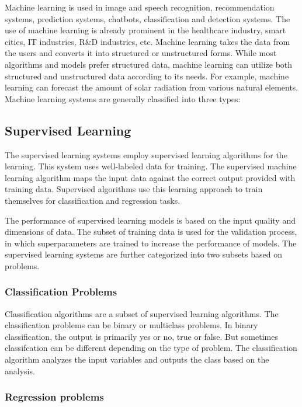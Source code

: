 Machine learning is used in image and speech recognition, recommendation systems, prediction systems, chatbots, classification and detection systems. The use of machine learning is already prominent in the healthcare industry, smart cities, IT industries, R\&D industries, etc. Machine learning takes the data from the users and converts it into structured or unstructured forms. While most algorithms and models prefer structured data, machine learning can utilize both structured and unstructured data according to its needs. For example, machine learning can forecast the amount of solar radiation from various natural elements. Machine learning systems are generally classified into three types:

\subsection{Supervised Learning}\label{subsec:supervised_learning_intro}

The supervised learning systems employ supervised learning algorithms for the learning. This system uses well-labeled data for training. The supervised machine learning algorithm maps the input data against the correct output provided with training data. Supervised algorithms use this learning approach to train themselves for classification and regression tasks.

The performance of supervised learning models is based on the input quality and dimensions of data. The subset of training data is used for the validation process, in which superparameters are trained to increase the performance of models. The supervised learning systems are further categorized into two subsets based on problems.

\subsubsection{Classification Problems}\label{subsubsec:classifcation_problems_intro}

Classification algorithms are a subset of supervised learning algorithms. The classification problems can be binary or multiclass problems. In binary classification, the output is primarily yes or no, true or false. But sometimes classifcation can be different depending on the type of problem. The classification algorithm analyzes the input variables and outputs the class based on the analysis.

\subsubsection{Regression problems}\label{subsubsec:regression_problems_intro}

